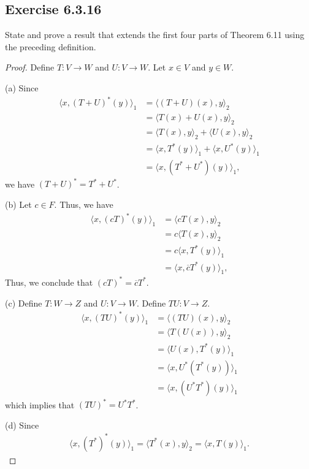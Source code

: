 \subsection*{Exercise 6.3.16} State and prove a result that extends the first four parts of Theorem 6.11 using the preceding definition. 
\begin{proof} Define \( T: V \to W  \) and \( U: V \to W  \). Let \( x \in V  \) and \( y \in W  \).
    \item[(a)] Since
        \begin{align*}
            \langle x , (T+U)^{*}(y) \rangle_1 &= \langle (T+U)(x) , y  \rangle_2 \\
                                             &= \langle T(x) + U(x) , y \rangle_2 \\
                                             &= \langle T(x) , y  \rangle_2 + \langle U(x) , y \rangle_2 \\
                                             &= \langle x , T^{*}(y) \rangle_1 + \langle x ,  U^{*}(y) \rangle_1 \\
                                             &= \langle x , (T^{*} + U^{*})(y) \rangle_1,
        \end{align*}
        we have \( (T+U)^{*} = T^{*} + U^{*} \).
    \item[(b)] Let \( c \in F   \). Thus, we have
        \begin{align*}
            \langle x , (cT)^{*}(y) \rangle_1 &= \langle cT(x) , y \rangle_2 \\
                                            &= c \langle T(x)   , y \rangle_2 \\
                                            &= c \langle x  , T^{*}(y) \rangle_1 \\
                                            &=  \langle x  ,  \overline{c} T^{*}(y) \rangle_1,
        \end{align*}
        Thus, we conclude that \( (cT)^{*} = \overline{c} T^{*} \).
    \item[(c)] Define \( T: W \to Z  \) and \( U: V \to W   \). Define \( TU: V \to Z  \).
        \begin{align*}
            \langle x , (TU)^{*}(y) \rangle_1 &= \langle (TU)(x) , y \rangle_2 \\
                                            &= \langle T(U(x)) , y \rangle_2 \\
                                            &= \langle U(x) , T^{*}(y) \rangle_1 \\
                                            &= \langle x  ,  U^{*}(T^{*}(y)) \rangle_1 \\
                                            &= \langle x , (U^{*}T^{*})(y) \rangle_1
        \end{align*}
        which implies that \(  (TU)^{*} = U^{*} T^{*} \).
    \item[(d)] Since
        \begin{align*}
            \langle x , (T^{*})^{*}(y) \rangle_1 = \langle T^{*}(x) , y  \rangle_2 
                                               = \langle x , T(y) \rangle_1.
        \end{align*}
\end{proof}

